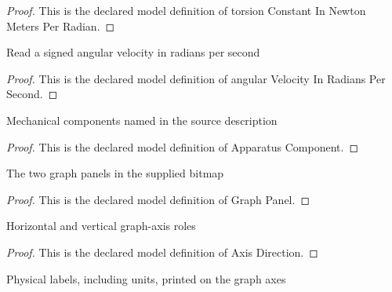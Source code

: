 \begin{proof}
  This is the declared model definition of torsion Constant In Newton Meters Per Radian.
\end{proof}
\begin{definition}
  \label{def:physics:phyx-mini-0278:phyxminiproblems-problemphyxmini0278-angularvelocityinradianspersecond}
  Read a signed angular velocity in radians per second
\end{definition}
\begin{proof}
  This is the declared model definition of angular Velocity In Radians Per Second.
\end{proof}
\begin{definition}
  \label{def:physics:phyx-mini-0278:phyxminiproblems-problemphyxmini0278-apparatuscomponent}
  Mechanical components named in the source description
\end{definition}
\begin{proof}
  This is the declared model definition of Apparatus Component.
\end{proof}
\begin{definition}
  \label{def:physics:phyx-mini-0278:phyxminiproblems-problemphyxmini0278-graphpanel}
  The two graph panels in the supplied bitmap
\end{definition}
\begin{proof}
  This is the declared model definition of Graph Panel.
\end{proof}
\begin{definition}
  \label{def:physics:phyx-mini-0278:phyxminiproblems-problemphyxmini0278-axisdirection}
  Horizontal and vertical graph-axis roles
\end{definition}
\begin{proof}
  This is the declared model definition of Axis Direction.
\end{proof}
\begin{definition}
  \label{def:physics:phyx-mini-0278:phyxminiproblems-problemphyxmini0278-figureaxislabel}
  Physical labels, including units, printed on the graph axes
\end{definition}
